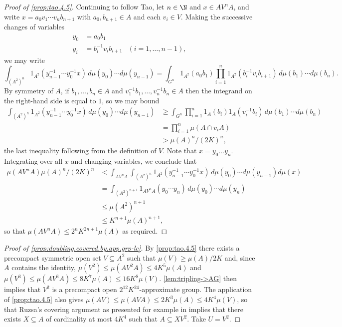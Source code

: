 \begin{proof}[Proof of \cref{prop:tao.4.5}]
Continuing to follow Tao, let $n\in\N$ and $x\in AV^nA$, and write $x=a_0v_1\cdots v_nb_{n+1}$ with $a_0,b_{n+1}\in A$ and each $v_i\in V$. Making the successive changes of variables
\begin{align*}
y_0 &= a_0 b_1\\
y_i &= b_i^{-1} v_i b_{i+1}&(i=1,\ldots,n-1),
\end{align*}
we may write
\[
\int_{(A^2)^n}1_{A^2}(y_{n-1}^{-1}\cdots y_0^{-1}x)\,d\mu(y_0)\cdots d\mu(y_{n-1})=\int_{G^n}1_{A^2}(a_0b_1)\prod_{i=1}^n1_{A^2}(b_i^{-1} v_i b_{i+1})\,d\mu(b_1)\cdots d\mu(b_n).
\]
By symmetry of $A$, if $b_1,\ldots,b_n\in A$ and $v_1^{-1}b_1,\ldots,v_n^{-1}b_n\in A$ then the integrand on the right-hand side is equal to $1$, so we may bound
\begin{align*}
\int_{(A^2)^n}1_{A^2}(y_{n-1}^{-1}\cdots y_0^{-1}x)\,d\mu(y_0)\cdots d\mu(y_{n-1})&\ge\int_{G^n}\prod_{i=1}^n1_{A}(b_i)1_A(v_i^{-1}b_i)\,d\mu(b_1)\cdots d\mu(b_n)\\
	&=\prod_{i=1}^n\mu(A\cap v_iA)\\
	&>\mu(A)^n/(2K)^n,
\end{align*}
the last inequality following from the definition of $V$. Note that $x=y_0\ldots y_n$. Integrating over all $x$ and changing variables, we conclude that
\begin{align*}
\mu(AV^nA)\mu(A)^n/(2K)^n&<\int_{AV^nA}\int_{(A^2)^n}1_{A^2}(y_{n-1}^{-1}\cdots y_0^{-1}x)\,d\mu(y_0)\cdots d\mu(y_{n-1})d\mu(x)\\
			&=\int_{(A^2)^{n+1}}1_{AV^nA}(y_0\cdots y_n)\,d\mu(y_0)\cdots d\mu(y_n)\\
			&\le\mu(A^2)^{n+1}\\
			&\le K^{n+1}\mu(A)^{n+1},
\end{align*}
so that $\mu(AV^nA)\le2^nK^{2n+1}\mu(A)$ as required.
\end{proof}
\begin{proof}[Proof of \cref{prop:doubling.covered.by.app.grp-lc}]
By \cref{prop:tao.4.5} there exists a precompact symmetric open set $V\subseteq A^2$ such that $\mu(V)\ge\mu(A)/2K$ and, since $A$ contains the identity, $\mu(V^2)\le\mu(AV^2A)\le4K^5\mu(A)$ and $\mu(V^3)\le\mu(AV^3A)\le8K^7\mu(A)\le16K^8\mu(V)$. \cref{lem:tripling->AG} then implies that $V^2$ is a precompact open $2^{12}K^{24}$-approximate group. The application of \cref{prop:tao.4.5} also gives $\mu(AV)\le\mu(AVA)\le2K^3\mu(A)\le4K^4\mu(V)$, so that Ruzsa's covering argument \cite{ruzsa} as presented for example in \cite[Lemma 2.4.4]{book} implies that there exists $X\subseteq A$ of cardinality at most $4K^4$ such that $A\subseteq XV^2$. Take $U=V^2$.
\end{proof}










